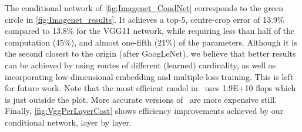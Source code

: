 \documentclass[thesis]{subfiles}
\begin{document}
	The conditional network of \cref{fig:Imagenet_CondNet} 
	corresponds to the green circle in \cref{fig:Imagenet_results}.
	It achieves a top-5, centre-crop error of
	13.9\% compared to 13.8\% for the VGG11 network, while requiring less than half of the computation (45\%),
	and almost one-fifth (21\%) of the parameters.
	Although it is the second closest to the origin (after GoogLeNet), we believe that better results can be achieved 
	by using routes of different (learned) cardinality, as well as incorporating low-dimensional embedding and multiple-loss training. This is left for future work. 
	Note that the most efficient model in~\citep{He2015b} uses 1.9E+10 flops which is just outside the plot. 
	More accurate versions of~\citep{He2015b} are more expensive still.
	Finally, \cref{fig:VggPerLayerCost} shows efficiency improvements achieved by our conditional network, layer by layer.
	
\end{document}

